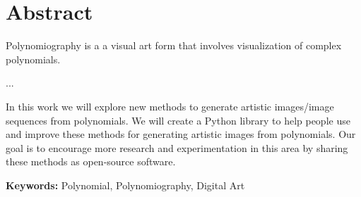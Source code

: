 \chapter*{Abstract}

Polynomiography is a a visual art form that involves visualization of complex polynomials.

...

In this work we will explore new methods to generate  artistic images/image sequences from polynomials. We will create a Python library to help people use and improve these methods for generating artistic images from polynomials. Our goal is to encourage more research and experimentation in this area by sharing these methods as open-source software.

\vfill

\textbf{Keywords:} Polynomial, Polynomiography, Digital Art
\clearpage